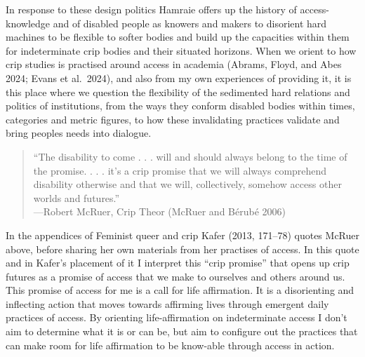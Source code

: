 In response to these design politics Hamraie offers up the history of
access-knowledge and of disabled people as knowers and makers to
disorient hard machines to be flexible to softer bodies and build up the
capacities within them for indeterminate crip bodies and their situated
horizons. When we orient to how crip studies is practised around access
in academia (Abrams, Floyd, and Abes 2024; Evans et al.~2024), and also
from my own experiences of providing it, it is this place where we
question the flexibility of the sedimented hard relations and politics
of institutions, from the ways they conform disabled bodies within
times, categories and metric figures, to how these invalidating
practices validate and bring peoples needs into dialogue.

\begin{quote}
``The disability to come . . . will and should always belong to the time
of the promise. . . . it's a crip promise that we will always comprehend
disability otherwise and that we will, collectively, somehow access
other worlds and futures.''\\
---Robert McRuer, Crip Theor (McRuer and Bérubé 2006)
\end{quote}

In the appendices of Feminist queer and crip Kafer (2013, 171--78)
quotes McRuer above, before sharing her own materials from her practises
of access. In this quote and in Kafer's placement of it I interpret this
``crip promise'' that opens up crip futures as a promise of access that
we make to ourselves and others around us. This promise of access for me
is a call for life affirmation. It is a disorienting and inflecting
action that moves towards affirming lives through emergent daily
practices of access. By orienting life-affirmation on indeterminate
access I don't aim to determine what it is or can be, but aim to
configure out the practices that can make room for life affirmation to
be know-able through access in action.

